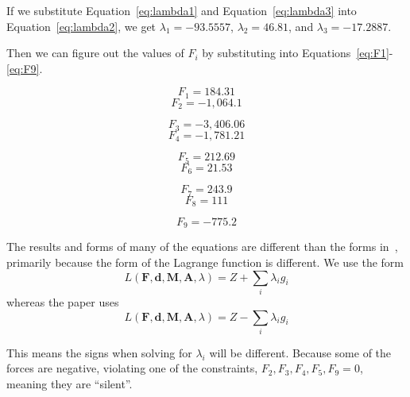 \documentclass[11pt]{scrartcl}
\begin{document}
If we substitute Equation~\ref{eq:lambda1} and Equation~\ref{eq:lambda3} into Equation~\ref{eq:lambda2}, we get
$\lambda_1 = -93.5557$,
$\lambda_2 = 46.81$, and 
$\lambda_3 = -17.2887$.

Then we can figure out the values of $F_i$ by substituting into Equations~\ref{eq:F1}-\ref{eq:F9}.
\begin{multicols}{2}
	\begin{equation}
		\label{eq:f1f}
		F_1 = 184.31
	\end{equation}
	\begin{equation}
		\label{eq:f2f}
		F_2 = -1,064.1
	\end{equation}
\end{multicols}
\begin{multicols}{2}
	\begin{equation}
		\label{eq:f3f}
		F_3 = -3,406.06
	\end{equation}
	\begin{equation}
		\label{eq:f4f}
		F_4 = -1,781.21
	\end{equation}
\end{multicols}
\begin{multicols}{2}
	\begin{equation}
		\label{eq:f5f}
		F_5 = 212.69
	\end{equation}
	\begin{equation}
		\label{eq:f6f}
		F_6 = 21.53
	\end{equation}
\end{multicols}
\begin{multicols}{2}
	\begin{equation}
		\label{eq:f7f}
		F_7 = 243.9
	\end{equation}
	\begin{equation}
		\label{eq:f8f}
		F_8 = 111
	\end{equation}
\end{multicols}
\begin{equation}
	\label{eq:f9f}
	F_9 = -775.2
\end{equation}

The results and forms of many of the equations are different than the forms in~\cite{RAIKOVA20011243},
primarily because the form of the Lagrange function is different.
We use the form
\[L(\boldsymbol{F}, \boldsymbol{d}, \boldsymbol{M}, \boldsymbol{A}, \lambda) = Z + \sum_{i}\lambda_ig_i\]
whereas the paper uses
\[L(\boldsymbol{F}, \boldsymbol{d}, \boldsymbol{M}, \boldsymbol{A}, \lambda) = Z - \sum_{i}\lambda_ig_i\]

This means the signs when solving for $\lambda_i$ will be different.
Because some of the forces are negative, violating one of the constraints, $F_2, F_3, F_4, F_5,F_9=0$, meaning they are ``silent''.
\printbibliography
\end{document}
